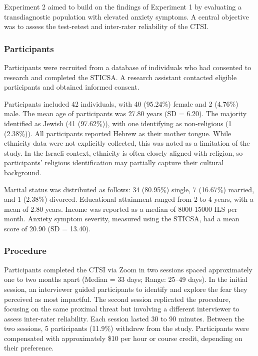 \documentclass[
  man,floatsintext]{apa7}
\begin{document}
Experiment 2 aimed to build on the findings of Experiment 1 by evaluating a transdiagnostic population with elevated anxiety symptoms.
A central objective was to assess the test-retest and inter-rater reliability of the CTSI.

\subsubsection{Participants}\label{participants-1}

Participants were recruited from a database of individuals who had consented to research and completed the STICSA.
A research assistant contacted eligible participants and obtained informed consent.

Participants included 42 individuals, with 40 (95.24\%) female and 2 (4.76\%) male.
The mean age of participants was 27.80 years (SD = 6.20).
The majority identified as Jewish (41 (97.62\%)), with one identifying as non-religious (1 (2.38\%)).
All participants reported Hebrew as their mother tongue.
While ethnicity data were not explicitly collected, this was noted as a limitation of the study.
In the Israeli context, ethnicity is often closely aligned with religion, so participants' religious identification may partially capture their cultural background.

Marital status was distributed as follows: 34 (80.95\%) single, 7 (16.67\%) married, and 1 (2.38\%) divorced.
Educational attainment ranged from 2 to 4 years, with a mean of 2.80 years.
Income was reported as a median of 8000-15000 ILS per month.
Anxiety symptom severity, measured using the STICSA, had a mean score of 20.90 (SD = 13.40).

\subsubsection{Procedure}\label{procedure-1}

Participants completed the CTSI via Zoom in two sessions spaced approximately one to two months apart (Median = 33 days; Range: 25--49 days).
In the initial session, an interviewer guided participants to identify and explore the fear they perceived as most impactful.
The second session replicated the procedure, focusing on the same proximal threat but involving a different interviewer to assess inter-rater reliability.
Each session lasted 30 to 90 minutes.
Between the two sessions, 5 participants (11.9\%) withdrew from the study.
Participants were compensated with approximately \$10 per hour or course credit, depending on their preference.
\end{document}
